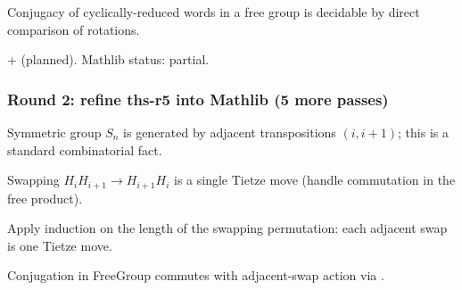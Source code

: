\begin{lemma}
\label{lem:tcr-r9}
Conjugacy of cyclically-reduced words in a free group is decidable by direct comparison of rotations.
\leanok
\end{lemma}

\begin{lemma}
\label{lem:tcr-r10}
 +  (planned).  Mathlib status: partial.
\leanok
\end{lemma}

\subsubsection*{Round 2: refine ths-r5 into Mathlib (5 more passes)}

\begin{lemma}
\label{lem:ths-r6}
Symmetric group $S_{n}$ is generated by adjacent transpositions $(i, i+1)$; this is a standard combinatorial fact.
\leanok
\end{lemma}

\begin{lemma}
\label{lem:ths-r7}
Swapping $H_{i}H_{i+1} \to H_{i+1}H_{i}$ is a single Tietze move (handle commutation in the free product).
\leanok
\end{lemma}

\begin{lemma}
\label{lem:ths-r8}
Apply induction on the length of the swapping permutation: each adjacent swap is one Tietze move.
\leanok
\end{lemma}

\begin{lemma}
\label{lem:ths-r9}
Conjugation in FreeGroup commutes with adjacent-swap action via .
\leanok\mathlibok
\end{lemma}

